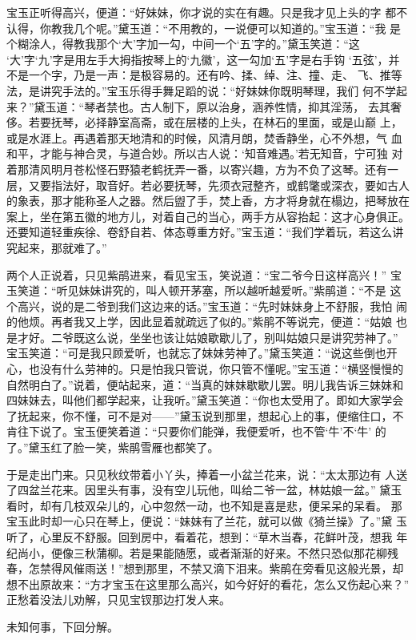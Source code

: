 宝玉正听得高兴，便道：“好妹妹，你才说的实在有趣。只是我才见上头的字
都不认得，你教我几个呢。”黛玉道：“不用教的，一说便可以知道的。”宝玉道：“我
是个糊涂人，得教我那个‘大’字加一勾，中间一个‘五’字的。”黛玉笑道：“这
‘大’字‘九’字是用左手大拇指按琴上的‘九徽’，这一勾加‘五’字是右手钩
‘五弦’，并不是一个字，乃是一声：是极容易的。还有吟、揉、绰、注、撞、走、
飞、推等法，是讲究手法的。”宝玉乐得手舞足蹈的说：“好妹妹你既明琴理，我们
何不学起来？”黛玉道：“琴者禁也。古人制下，原以治身，涵养性情，抑其淫荡，
去其奢侈。若要抚琴，必择静室高斋，或在层楼的上头，在林石的里面，或是山巅
上，或是水涯上。再遇着那天地清和的时候，风清月朗，焚香静坐，心不外想，气
血和平，才能与神合灵，与道合妙。所以古人说：‘知音难遇。’若无知音，宁可独
对着那清风明月苍松怪石野猿老鹤抚弄一番，以寄兴趣，方为不负了这琴。还有一
层，又要指法好，取音好。若必要抚琴，先须衣冠整齐，或鹤氅或深衣，要如古人
的象表，那才能称圣人之器。然后盥了手，焚上香，方才将身就在榻边，把琴放在
案上，坐在第五徽的地方儿，对着自己的当心，两手方从容抬起：这才心身俱正。
还要知道轻重疾徐、卷舒自若、体态尊重方好。”宝玉道：“我们学着玩，若这么讲
究起来，那就难了。”

两个人正说着，只见紫鹃进来，看见宝玉，笑说道：“宝二爷今日这样高兴！”
宝玉笑道：“听见妹妹讲究的，叫人顿开茅塞，所以越听越爱听。”紫鹃道：“不是
这个高兴，说的是二爷到我们这边来的话。”宝玉道：“先时妹妹身上不舒服，我怕
闹的他烦。再者我又上学，因此显着就疏远了似的。”紫鹃不等说完，便道：“姑娘
也是才好。二爷既这么说，坐坐也该让姑娘歇歇儿了，别叫姑娘只是讲究劳神了。”
宝玉笑道：“可是我只顾爱听，也就忘了妹妹劳神了。”黛玉笑道：“说这些倒也开
心，也没有什么劳神的。只是怕我只管说，你只管不懂呢。”宝玉道：“横竖慢慢的
自然明白了。”说着，便站起来，道：“当真的妹妹歇歇儿罢。明儿我告诉三妹妹和
四妹妹去，叫他们都学起来，让我听。”黛玉笑道：“你也太受用了。即如大家学会
了抚起来，你不懂，可不是对——”黛玉说到那里，想起心上的事，便缩住口，不
肯往下说了。宝玉便笑着道：“只要你们能弹，我便爱听，也不管‘牛’不‘牛’
的了。”黛玉红了脸一笑，紫鹃雪雁也都笑了。

于是走出门来。只见秋纹带着小丫头，捧着一小盆兰花来，说：“太太那边有
人送了四盆兰花来。因里头有事，没有空儿玩他，叫给二爷一盆，林姑娘一盆。”
黛玉看时，却有几枝双朵儿的，心中忽然一动，也不知是喜是悲，便呆呆的呆看。
那宝玉此时却一心只在琴上，便说：“妹妹有了兰花，就可以做《猗兰操》了。”黛
玉听了，心里反不舒服。回到房中，看着花，想到：“草木当春，花鲜叶茂，想我
年纪尚小，便像三秋蒲柳。若是果能随愿，或者渐渐的好来。不然只恐似那花柳残
春，怎禁得风催雨送！”想到那里，不禁又滴下泪来。紫鹃在旁看见这般光景，却
想不出原故来：“方才宝玉在这里那么高兴，如今好好的看花，怎么又伤起心来？”
正愁着没法儿劝解，只见宝钗那边打发人来。

未知何事，下回分解。